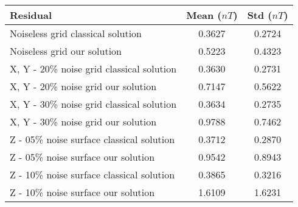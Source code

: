 {
	\begin{center}
		\begin{tabular}[]{|l|c|c|}
			\hline
			Residual                                                      & Mean ($nT$)  & Std ($nT$) \\
			\hline 
			Noiseless grid classical solution                             & 0.3627 & 0.2724 \\
			\hline
			Noiseless grid our solution                                   & 0.5223 & 0.4323 \\
			\hline
			X, Y - 20\% noise grid classical solution                     & 0.3630 & 0.2731 \\
			\hline
			X, Y - 20\% noise grid our solution                           & 0.7147 & 0.5622 \\
			\hline
			X, Y - 30\% noise grid classical solution                     & 0.3634 & 0.2735 \\
			\hline
			X, Y - 30\% noise grid our solution                           & 0.9788 & 0.7462 \\
			\hline
			Z - 05\% noise surface classical solution                     & 0.3712 & 0.2870 \\
			\hline
			Z - 05\% noise surface our solution                           & 0.9542 & 0.8943 \\
			\hline
			Z - 10\% noise surface classical solution                     & 0.3865 & 0.3216 \\
			\hline
			Z - 10\% noise surface our solution                           & 1.6109 & 1.6231 \\
			\hline
		\end{tabular}
	\end{center} 
}

